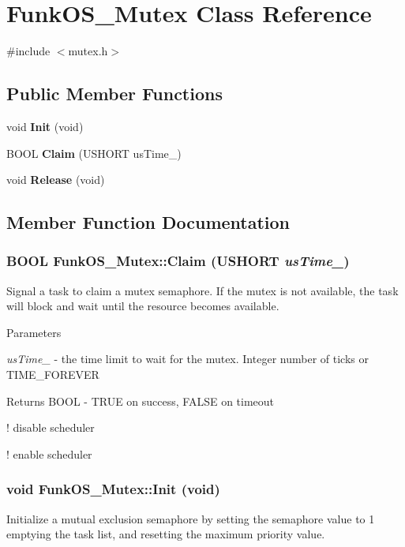 \section{FunkOS\_\-Mutex Class Reference}
\label{class_funk_o_s___mutex}


{\ttfamily \#include $<$mutex.h$>$}\subsection*{Public Member Functions}
\begin{DoxyCompactItemize}
\item 
void {\bf Init} (void)
\item 
BOOL {\bf Claim} (USHORT usTime\_\-)
\item 
void {\bf Release} (void)
\end{DoxyCompactItemize}


\subsection{Member Function Documentation}
\subsubsection[{Claim}]{\setlength{\rightskip}{0pt plus 5cm}BOOL FunkOS\_\-Mutex::Claim (USHORT {\em usTime\_\-})}\label{class_funk_o_s___mutex_a4a4c279f75f4de2a19d121e63d873ba1}
Signal a task to claim a mutex semaphore. If the mutex is not available, the task will block and wait until the resource becomes available.


\begin{DoxyParams}{Parameters}
\item[{\em usTime\_\-}]-\/ the time limit to wait for the mutex. Integer number of ticks or TIME\_\-FOREVER \end{DoxyParams}
\begin{DoxyReturn}{Returns}
BOOL -\/ TRUE on success, FALSE on timeout 
\end{DoxyReturn}


! disable scheduler

! enable scheduler 
\subsubsection[{Init}]{\setlength{\rightskip}{0pt plus 5cm}void FunkOS\_\-Mutex::Init (void)}\label{class_funk_o_s___mutex_a2dd20e01ef47dc6bb093ebca746d63ee}
Initialize a mutual exclusion semaphore by setting the semaphore value to 1 emptying the task list, and resetting the maximum priority value. 
